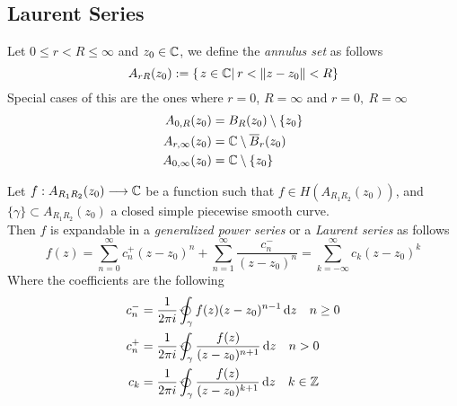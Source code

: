 \documentclass[../complete.tex]{subfiles}
\begin{document}
\subsection{Laurent Series}
\begin{dfn}
	Let $0\le r<R\le\infty$ and $z_0\in\mathbb{C}$, we define the \textit{annulus set} as follows
	\begin{equation}
		A_{rR}(z_0):=\left\{ \left.z\in\mathbb{C}\right|_{}r<\norm{z-z_0}<R \right\}
		\label{eq:annulusdom}
	\end{equation}
	Special cases of this are the ones where $r=0$, $R=\infty$ and $r=0,\ R=\infty$
	\begin{equation*}
		\begin{aligned}
			A_{0,R}(z_0)&=B_R(z_0)\setminus\{z_0\}\\
			A_{r,\infty}(z_0)&=\mathbb{C}\setminus\overline{B}_r(z_0)\\
			A_{0,\infty}(z_0)&=\mathbb{C}\setminus\{z_0\}
		\end{aligned}
	\end{equation*}
\end{dfn}
\begin{thm}
	Let $f:A_{R_1R_2}(z_0)\overset{}{\longrightarrow}\mathbb{C}$ be a function such that $f\in H\left(A_{R_1R_2}(z_0)\right)$, and $\{\gamma\}\subset A_{R_1R_2}(z_0)$ a closed simple piecewise smooth curve.\\
	Then $f$ is expandable in a \textit{generalized power series} or a \textit{Laurent series} as follows
	\begin{equation}
		f(z)=\sum_{n=0}^{\infty}c_n^+(z-z_0)^n+\sum_{n=1}^{\infty}\frac{c_n^-}{(z-z_0)^n}=\sum_{k=-\infty}^{\infty}c_k(z-z_0)^k
		\label{eq:laurentseries}
	\end{equation}
	Where the coefficients are the following
	\begin{equation}
		\begin{aligned}
			c_n^-&=\frac{1}{2\pi i}\ointccw_\gamma f(z)(z-z_0)^{n-1}\diff z\quad n\ge0\\
			c_n^+&=\frac{1}{2\pi i}\ointccw_\gamma\frac{f(z)}{(z-z_0)^{n+1}}\diff z\quad n>0\\
			c_k&=\frac{1}{2\pi i}\ointccw_\gamma\frac{f(z)}{(z-z_0)^{k+1}}\diff z\quad k\in\Z
		\end{aligned}
		\label{eq:coefficientlaurent}
	\end{equation}
\end{thm}
\end{document}
